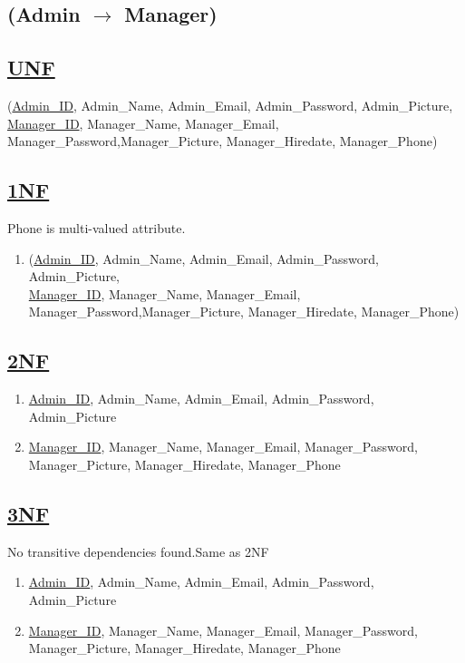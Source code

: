 \subsection{\texorpdfstring{\centering (Admin $\rightarrow$ Manager)}{(Admin - Manager)}}


\subsection*{\underline{UNF}}

(\underline{Admin\_ID}, Admin\_Name, Admin\_Email, Admin\_Password, Admin\_Picture,\\
\underline{Manager\_ID}, Manager\_Name, Manager\_Email, Manager\_Password,Manager\_Picture, Manager\_Hiredate, Manager\_Phone)

\subsection*{\underline{1NF}}
Phone is multi-valued attribute.
\vskip 0.2in

\begin{enumerate}
    \item (\underline{Admin\_ID}, Admin\_Name, Admin\_Email, Admin\_Password, Admin\_Picture,\\
          \underline{Manager\_ID}, Manager\_Name, Manager\_Email, Manager\_Password,Manager\_Picture, Manager\_Hiredate, Manager\_Phone)
\end{enumerate}

\subsection*{\underline{2NF}}
\vskip 0.2in

\begin{enumerate}
    \item \underline{Admin\_ID}, Admin\_Name, Admin\_Email, Admin\_Password, Admin\_Picture
    \item \underline{Manager\_ID}, Manager\_Name, Manager\_Email, Manager\_Password, Manager\_Picture, Manager\_Hiredate, Manager\_Phone
\end{enumerate}

\subsection*{\underline{3NF}}
No transitive dependencies found.Same as 2NF
\begin{enumerate}
    \item \underline{Admin\_ID}, Admin\_Name, Admin\_Email, Admin\_Password, Admin\_Picture
    \item \underline{Manager\_ID}, Manager\_Name, Manager\_Email, Manager\_Password, Manager\_Picture, Manager\_Hiredate, Manager\_Phone
\end{enumerate}

